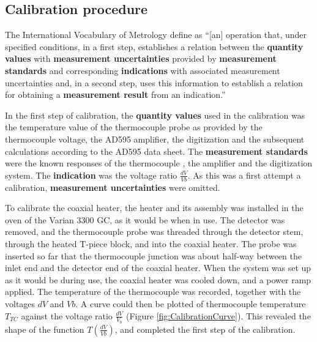 \subsection{Calibration procedure}

The International Vocabulary of Metrology \autocite{JCGM200:2012} define
 as ``[an] operation that, under specified conditions, in a
first step, establishes a relation between the \textbf{quantity values} with
\textbf{measurement uncertainties} provided by \textbf{measurement standards}
and corresponding \textbf{indications} with associated measurement uncertainties
and, in a second step, uses this information to establish a relation for
obtaining a \textbf{measurement result} from an indication.''

In the first step of calibration, the \textbf{quantity values} used in the
calibration was the temperature value of the thermocouple probe as provided by
the thermocouple voltage, the AD595 amplifier, the digitization and the
subsequent calculations according to the AD595 data sheet. The
\textbf{measurement standards} were the known responses of the thermocouple
\autocite{Ripple1995}, the amplifier and the digitization system. The
\textbf{indication} was the voltage ratio \(\frac{dV}{Vb}\). As this was a first
attempt a calibration, \textbf{measurement uncertainties} were omitted.

To calibrate the coaxial heater, the heater and its assembly was installed in
the oven of the Varian 3300 GC, as it would be when in use. The detector was
removed, and the thermocouple probe was threaded through the detector stem,
through the heated T-piece block, and into the coaxial heater. The probe was
inserted so far that the thermocouple junction was about half-way between the
inlet end and the detector end of the coaxial heater. When the system was set up
as it would be during use, the coaxial heater was cooled down, and a power ramp
applied. The temperature of the thermocouple was recorded, together with the
voltages \(dV\) and \(Vb\). A curve could then be plotted of thermocouple
temperature \(T_{TC}\) against the voltage ratio \( \frac{dV}{V_b} \) (Figure
\ref{fig:CalibrationCurve}). This revealed the shape of the function
\(T(\frac{dV}{Vb})\), and completed the first step of the calibration.

